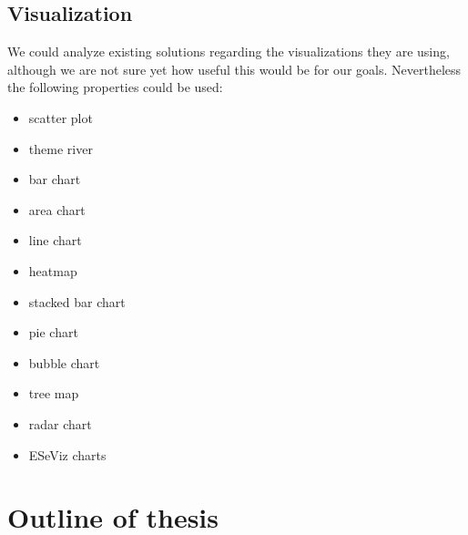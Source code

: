 \documentclass[authoryear,preprint,review,12pt]{elsarticle}
\begin{document}
\subsection{Visualization}
We could analyze existing solutions regarding the visualizations they are using, although we are
not sure yet how useful this would be for our goals. Nevertheless the following properties could be
used:
\begin{itemize}
  \item scatter plot
  \item theme river
  \item bar chart
  \item area chart
  \item line chart
  \item heatmap
  \item stacked bar chart
  \item pie chart
  \item bubble chart
  \item tree map
  \item radar chart
  \item ESeViz charts \citep{yeshchenkoSurveyApproachesEvent2022}
\end{itemize}

\section{Outline of thesis}
\label{sec:outline}

\renewcommand{\labelenumii}{\arabic{enumi}.\arabic{enumii}}
\renewcommand{\labelenumiii}{\arabic{enumi}.\arabic{enumii}.\arabic{enumiii}}
\renewcommand{\labelenumiv}{\arabic{enumi}.\arabic{enumii}.\arabic{enumiii}.\arabic{enumiv}}
\end{document}
